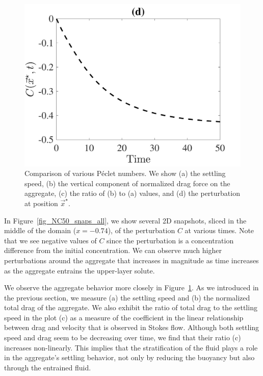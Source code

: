 \begin{figure}[h]
\begin{center}
		\includegraphics[scale=0.35]{./figures/fig_NC50_bs_C_star}
	\caption{Comparison of various Péclet numbers. We show (a) the settling speed, (b) the vertical component of normalized drag force on the aggregate, (c) the ratio of (b) to (a) values, and (d) the perturbation at position $\vec{x}^{\star}$. }
	\label{fig_NC50_base_case_all}
\end{center}
\end{figure}
\par 
In Figure~\ref{fig_NC50_snaps_all}, we show several 2D snapshots, sliced in the middle of the domain ($x = -0.74$), of the perturbation $C$ at various times. Note that we see negative values of $C$ since the perturbation is a concentration difference from the initial concentration. 
We can observe much higher perturbations around the aggregate that increases in magnitude as time increases as the aggregate entrains the upper-layer solute. 
\par
We observe the aggregate behavior more closely in Figure~\ref{fig_NC50_base_case_all}. As we introduced in the previous section, we measure (a) the settling speed and (b) the normalized total drag of the aggregate. We also exhibit the ratio of total drag to the settling speed in the plot (c) as a measure of the coefficient in the linear relationship between drag and velocity
that is observed in Stokes flow. Although both settling speed and drag seem to be decreasing over time, we find that their ratio (c) increases non-linearly. This implies that the stratification of the fluid plays a role in the aggregate's settling behavior, not only by reducing the buoyancy but also through the entrained fluid. 
